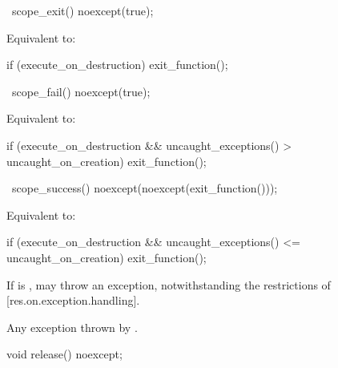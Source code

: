 \documentclass[ebook,11pt,article]{memoir}
\begin{document}
\begin{itemdecl}
~scope_exit() noexcept(true);
\end{itemdecl}

\begin{itemdescr}
\pnum
\effects 
Equivalent to:
\begin{codeblock}
if (execute_on_destruction)
	exit_function();
\end{codeblock}
\end{itemdescr}

\begin{itemdecl}
~scope_fail() noexcept(true);
\end{itemdecl}

\begin{itemdescr}
\pnum
\effects 
Equivalent to:
\begin{codeblock}
if (execute_on_destruction
   && uncaught_exceptions() > uncaught_on_creation)
	exit_function();
\end{codeblock}
\end{itemdescr}

\begin{itemdecl}
~scope_success() noexcept(noexcept(exit_function()));
\end{itemdecl}

\begin{itemdescr}
\pnum
\effects
Equivalent to:
\begin{codeblock}
if (execute_on_destruction 
   && uncaught_exceptions() <= uncaught_on_creation)
	exit_function();   
\end{codeblock}

\pnum
\begin{note}
If  is ,  may throw an exception, notwithstanding the restrictions of [res.on.exception.handling].
\end{note}

\pnum
\throws
Any exception thrown by .

\end{itemdescr}

\begin{itemdecl}
void release() noexcept;
\end{itemdecl}
\end{document}
